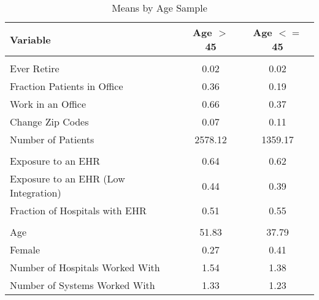 \begin{table}[ht]

\caption{Means by Age Sample}
\label{tab:sumstats2}
\centering
\begin{tabular}[ht]{lcc}
\toprule
Variable & Age $>$ 45 & Age $<=$ 45\\
\midrule
\addlinespace[0.3em]
\multicolumn{3}{l}{\textbf{Outcomes}}\\
\hspace{1em}Ever Retire & 0.02 & 0.02\\
\hspace{1em}Fraction Patients in Office & 0.36 & 0.19\\
\hspace{1em}Work in an Office & 0.66 & 0.37\\
\hspace{1em}Change Zip Codes & 0.07 & 0.11\\
\hspace{1em}Number of Patients & 2578.12 & 1359.17\\
\addlinespace[0.3em]
\multicolumn{3}{l}{\textbf{Treatment}}\\
\hspace{1em}Exposure to an EHR & 0.64 & 0.62\\
\hspace{1em}Exposure to an EHR (Low Integration) & 0.44 & 0.39\\
\hspace{1em}Fraction of Hospitals with EHR & 0.51 & 0.55\\
\addlinespace[0.3em]
\multicolumn{3}{l}{\textbf{Characteristics}}\\
\hspace{1em}Age & 51.83 & 37.79\\
\hspace{1em}Female & 0.27 & 0.41\\
\hspace{1em}Number of Hospitals Worked With & 1.54 & 1.38\\
\hspace{1em}Number of Systems Worked With & 1.33 & 1.23\\
\bottomrule
\end{tabular}
\end{table}
